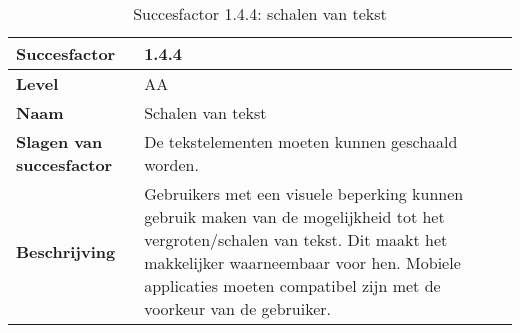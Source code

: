 \begin{table}[H]
    \centering
    \caption{Succesfactor 1.4.4: schalen van tekst }
    \hspace*{-1cm}\begin{tabular}{|l|p{12cm}|} 
        \hline
        \textbf{Succesfactor}                 & 1.4.4                                                                                                                                                                                                                                                                                                                                                                                                                                                                                                             \\ 
        \hline
        \textbf{Level}                        & AA                                                                                                                                                                                                                                                                                                                                                                                                                                                                                                                 \\ 
        \hline
        \textbf{Naam}                         & Schalen van tekst~                                                                                                                                                                                                                                                                                                                                                                                                                                                                                      \\ 
        \hline
        \textbf{Slagen van succesfactor}      & De tekstelementen moeten kunnen geschaald worden.                                                                                                                                                                                                                                                                                                                                                            \\ 
        \hline
        \textbf{Beschrijving}                 & Gebruikers met een visuele beperking kunnen gebruik maken van de mogelijkheid tot het vergroten/schalen van tekst. Dit maakt het makkelijker waarneembaar voor hen. Mobiele applicaties moeten compatibel zijn met de voorkeur van de gebruiker.\\ 

\end{tabular}
\end{table}
